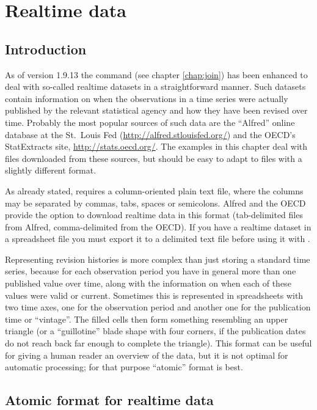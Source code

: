 \chapter{Realtime data}
\label{chap:realtime}

\section{Introduction}
\label{sec:realtime-intro}

As of  version 1.9.13 the  command (see chapter
\ref{chap:join}) has been enhanced to deal with so-called realtime
datasets in a straightforward manner.  Such datasets contain
information on when the observations in a time series were actually
published by the relevant statistical agency and how they have been
revised over time. Probably the most popular sources of such data are
the ``Alfred'' online database at the St.\ Louis Fed
(\url{http://alfred.stlouisfed.org/}) and the OECD's
\textsf{StatExtracts} site, \url{http://stats.oecd.org/}.  The
examples in this chapter deal with files downloaded from these
sources, but should be easy to adapt to files with a slightly
different format.

As already stated,  requires a column-oriented plain text
file, where the columns may be separated by commas, tabs, spaces or
semicolons. Alfred and the OECD provide the option to download
realtime data in this format (tab-delimited files from Alfred,
comma-delimited from the OECD). If you have a realtime dataset in a
spreadsheet file you must export it to a delimited text file before
using it with .

Representing revision histories is more complex than just storing a
standard time series, because for each observation period you have in
general more than one published value over time, along with the
information on when each of these values were valid or
current. Sometimes this is represented in spreadsheets with two time
axes, one for the observation period and another one for the
publication time or ``vintage''. The filled cells then form something
resembling an upper triangle (or a ``guillotine'' blade shape with
four corners, if the publication dates do not reach back far enough to
complete the triangle). This format can be useful for giving a human
reader an overview of the data, but it is not optimal for automatic
processing; for that purpose ``atomic'' format is best.

\section{Atomic format for realtime data}
\label{sec:realtime-atomic}

